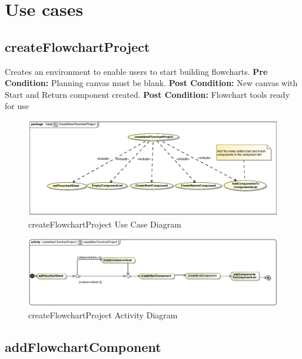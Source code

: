 \documentclass[11pt,a4paper,titlepage]{article}
\begin{document}
\newpage
\section{Use cases}

\subsection{createFlowchartProject}
Creates an environment to enable users to start building flowcharts.\newline\newline
\textbf{Pre Condition:} Planning canvas must be blank.\newline\newline
\textbf{Post Condition:} New canvas with Start and Return component created.\newline
\textbf{Post Condition:} Flowchart tools ready for use\newline

\begin{figure}[H]
  \centering
\includegraphics[width=500px]{createNewFlowchartProject.eps}
\caption{createFlowchartProject Use Case Diagram}
\end{figure}

\begin{figure}[H]
  \centering
\includegraphics[width=500px]{createNewFlowchartProjectActivity.eps}
\caption{createFlowchartProject Activity Diagram}
\end{figure}

\newpage
\subsection{addFlowchartComponent}
\end{document}
